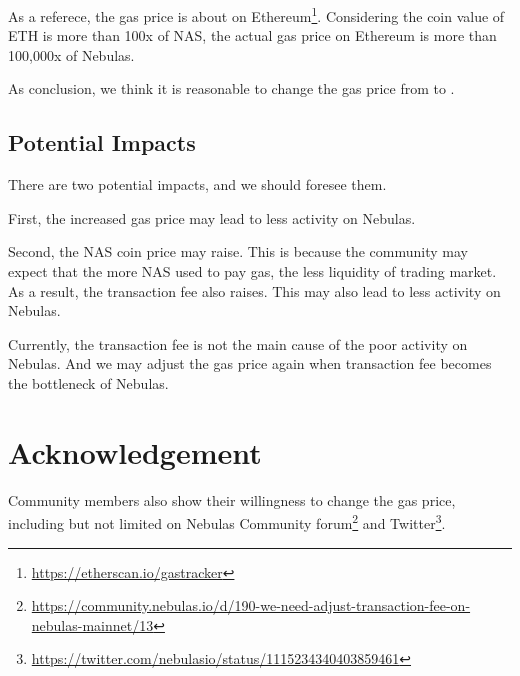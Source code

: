 \documentclass[11pt]{article}
\begin{document}
As a referece, the gas price is about  on Ethereum\footnote{\url{https://etherscan.io/gastracker}}. Considering the coin value of ETH is more than 100x of NAS, the actual gas price on Ethereum is more than 100,000x of Nebulas.

As conclusion, we think it is reasonable to change the gas price from  to .

\subsection{Potential Impacts}
There are two potential impacts, and we should foresee them.

First, the increased gas price may lead to less activity on Nebulas.

Second, the NAS coin price may raise. This is because the community may expect
that the more NAS used to pay gas, the less liquidity of trading market. As a result,
the transaction fee also raises. This may also lead to less activity on Nebulas.

\vspace{1em}
Currently, the transaction fee is not the main cause of the poor activity on Nebulas.
And we may adjust the gas price again when transaction fee becomes the bottleneck of Nebulas.
\section{Acknowledgement}
Community members also show their willingness to change the gas price, including but not limited on Nebulas Community forum\footnote{\url{https://community.nebulas.io/d/190-we-need-adjust-transaction-fee-on-nebulas-mainnet/13}} and Twitter\footnote{\url{https://twitter.com/nebulasio/status/1115234340403859461}}.
\end{document}
